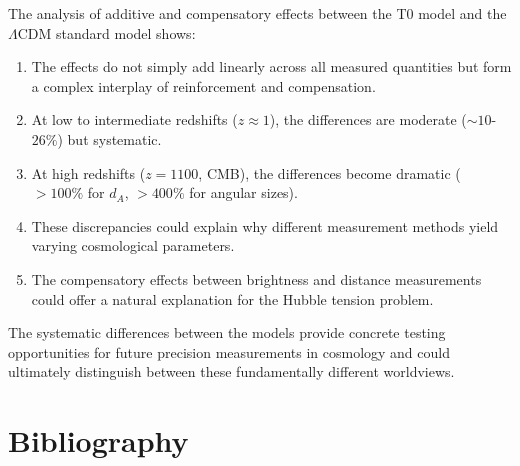 \documentclass[a4paper,12pt]{article}
\theoremstyle{definition}
\theoremstyle{remark}
\begin{document}
	The analysis of additive and compensatory effects between the T0 model and the $\Lambda$CDM standard model shows:
	
	\begin{enumerate}
		\item The effects do not simply add linearly across all measured quantities but form a complex interplay of reinforcement and compensation.
		
		\item At low to intermediate redshifts ($z \approx 1$), the differences are moderate ($\sim10$-$26\%$) but systematic.
		
		\item At high redshifts ($z = 1100$, CMB), the differences become dramatic ($>100\%$ for $d_A$, $>400\%$ for angular sizes).
		
		\item These discrepancies could explain why different measurement methods yield varying cosmological parameters.
		
		\item The compensatory effects between brightness and distance measurements could offer a natural explanation for the Hubble tension problem.
	\end{enumerate}
	
	The systematic differences between the models provide concrete testing opportunities for future precision measurements in cosmology and could ultimately distinguish between these fundamentally different worldviews.
	
	\section{Bibliography}
	
\end{document}
